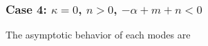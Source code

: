 \documentclass[a4paper,11pt]{article}
\theoremstyle{remark}
\begin{document}
\subsubsection{Case 4: $\kappa=0$, $n>0$, $-\alpha +m +n<0$}

%
%
The asymptotic behavior of each modes are
\end{document}
